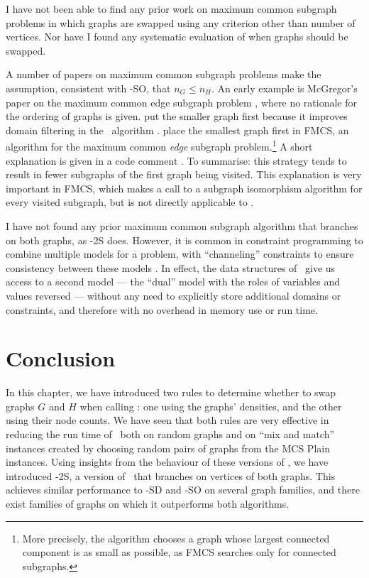 I have not been able to find any prior work on maximum common subgraph problems in which
graphs are swapped using any criterion other than number of vertices.  Nor have I found
any systematic evaluation of when graphs should be swapped.

A number of papers on maximum common subgraph problems make the assumption, consistent
with \McSplit-SO, that $n_G \leq n_H$.  An early example
is McGregor's paper on the maximum common edge subgraph problem \citep{DBLP:journals/spe/McGregor82},
where no rationale for the ordering of graphs is given.
\citet{UpcomingAAAIPaper} put the smaller graph first
because it improves domain filtering in the \kDown\ algorithm \citep{McCreesh2022Comments}.
\citet{DBLP:journals/jcheminf/DalkeH13} place the smallest
graph first in FMCS, an algorithm for the maximum
common \emph{edge} subgraph problem.\footnote{More precisely, the algorithm chooses a graph whose largest
connected component is as small as possible, as FMCS searches only for connected subgraphs.}
A short explanation is given in a code comment \citep{DalkeFmcsSource}. To summarise: this strategy tends to
result in fewer subgraphs of the first graph being visited.  This explanation is very
important in FMCS, which makes a call to a subgraph isomorphism algorithm for every visited
subgraph, but is not directly applicable to \McSplit.

I have not found any prior maximum common subgraph algorithm that branches on both graphs,
as \McSplit-2S does.  However, it is common in constraint programming to combine multiple models
for a problem, with ``channeling'' constraints to ensure consistency between these models
\citep{DBLP:journals/constraints/ChengCLW99}.  In effect, the data structures of \McSplit\
give us access to a second model --- the ``dual'' model with the roles of variables and values
reversed \citep{DBLP:conf/ecai/Geelen92} --- without any need to explicitly store additional
domains or constraints, and therefore with no overhead in memory use
or run time.

\section{Conclusion}\label{sec:swapping-conclusion}

In this chapter, we have introduced two rules to determine whether to swap graphs $G$ and $H$
when calling \McSplit: one using the graphs' densities, and the other using their node counts.
We have seen that both rules are very effective in reducing the run time of \McSplit\ both on random
graphs and on ``mix and match'' instances created by choosing random pairs of graphs from the
MCS Plain instances.  Using insights from the behaviour of these versions of \McSplit, we have
introduced \McSplit-2S, a version of \McSplit\ that branches on vertices of both graphs.
This achieves similar performance to \McSplit-SD and \McSplit-SO on several graph
families, and there exist families of graphs on which it outperforms both
algorithms.


